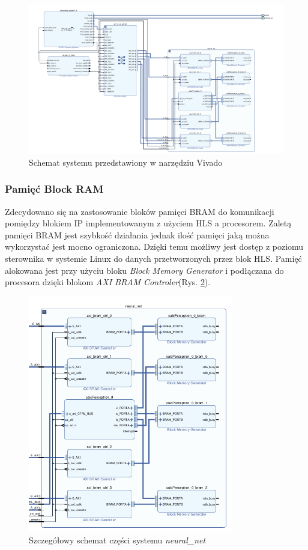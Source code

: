 \begin{figure}[h]
  \centering
  \includegraphics[width=\textwidth]{img/vivado-block-design.png}
  \caption{Schemat systemu przedstawiony w narzędziu Vivado}
  \label{vivado-block-design}
\end{figure}

\subsubsection{Pamięć Block RAM}
Zdecydowano się na zastosowanie bloków pamięci BRAM do komunikacji pomiędzy 
blokiem IP implementowanym z użyciem HLS a procesorem. Zaletą pamięci BRAM jest szybkość 
działania jednak ilość pamięci jaką można wykorzystać jest mocno ograniczona. 
Dzięki temu możliwy jest dostęp z poziomu sterownika w systemie Linux do danych
przetworzonych przez blok HLS. Pamięć alokowana jest przy użyciu bloku 
\emph{Block Memory Generator} i podłączana do procesora dzięki blokom 
\emph{AXI BRAM Controler}(Rys. \ref{vivado-block-neural}).

\begin{figure}[h]
  \centering
  \includegraphics[width=0.8\textwidth]{img/vivado-neuralnet.png}
  \caption{Szczegółowy schemat części systemu \emph{neural\_net}}
  \label{vivado-block-neural}
\end{figure}


